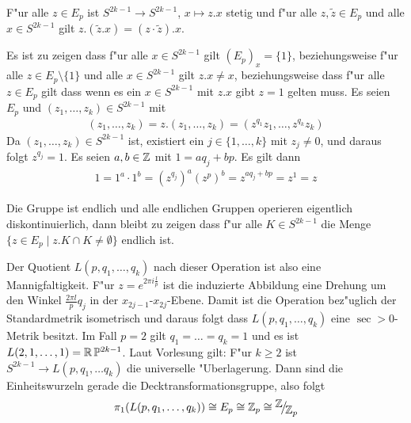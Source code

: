 \begin{Loes}\begin{description}[leftmargin=*]
\item[Operation:]
	F"ur alle $z \in E_p$ ist $S^{2k-1} \to S^{2k-1}$, $x \mapsto z.x$ stetig und f"ur alle $z, \tilde z \in E_p$ und alle $x \in S^{2k-1}$ gilt $z.(\tilde z.x) = (z \cdot \tilde z).x$.
\item[Die Operation ist frei:]
	Es ist zu zeigen dass f"ur alle $x \in S^{2k-1}$ gilt $(E_p)_x = \{1\}$, beziehungsweise f"ur alle $z \in E_p \setminus \{1\}$ und alle $x \in S^{2k-1}$ gilt $z.x \ne x$, beziehungsweise dass f"ur alle $z \in E_p$ gilt dass wenn es ein $x \in S^{2k-1}$ mit $z.x$ gibt $z=1$ gelten muss.
	Es seien $E_p$ und $(z_1,\ldots ,z_k) \in S^{2k-1}$ mit
	\begin{align*}
		(z_1,\ldots , z_k) = z.(z_1,\ldots ,z_k) = (z^{q_1} z_1, \ldots , z^{q_k} z_k)
	\end{align*}
	Da $(z_1, \ldots , z_k) \in S^{2k-1}$ ist, existiert ein $j \in \{1, \ldots ,k\}$ mit $z_j \ne 0$, und daraus folgt $z^{q_j} = 1$.
	Es seien $a,b \in \operatorname{\mathbb{Z}}$ mit $1 = a q_j + b p$. Es gilt dann
	\begin{align*}
		1 = 1^a \cdot 1^b = (z^{q_j})^a (z^p)^b = z^{a q_j + b p} = z^1 = z
	\end{align*}
\item[Die Operation ist eigentlich kontinuierlich]
	Die Gruppe ist endlich und alle endlichen Gruppen operieren eigentlich diskontinuierlich, dann bleibt zu zeigen dass f"ur alle $K \in S^{2k-1}$ die Menge $\{ z \in E_p \mid z.K \cap K \ne \emptyset \}$ endlich ist.
\end{description}\end{Loes}

Der Quotient $L(p, q_1, \ldots ,q_k)$ nach dieser Operation ist also eine Mannigfaltigkeit.
F"ur $z = e^{2 \pi i \frac{l}{p}}$ ist die induzierte Abbildung eine Drehung um den Winkel $\frac{2 \pi l}{p} q_j$ in der $x_{2j-1}$-$x_{2j}$-Ebene.
Damit ist die Operation bez"uglich der Standardmetrik isometrisch und daraus folgt dass $L(p, q_1, \ldots , q_k)$ eine $\sec > 0$-Metrik besitzt.
Im Fall $p = 2$ gilt $q_1 = \ldots = q_k = 1$ und es ist $L(2, 1, \ldots ,1) = \operatorname{\mathbb{R}}\mathbb{P}^{2k-1}$.
Laut Vorlesung gilt: F"ur $k \ge 2$ ist $S^{2k-1} \to L(p, q_1, \ldots  q_k)$ die universelle "Uberlagerung.
Dann sind die Einheitswurzeln gerade die Decktransformationsgruppe, also folgt
\begin{align*}
	\pi_1(L(p, q_1, \ldots ,q_k)) \cong E_p \cong \Z_p \cong \FakRaum{\Z}{\Z_p}
\end{align*}

